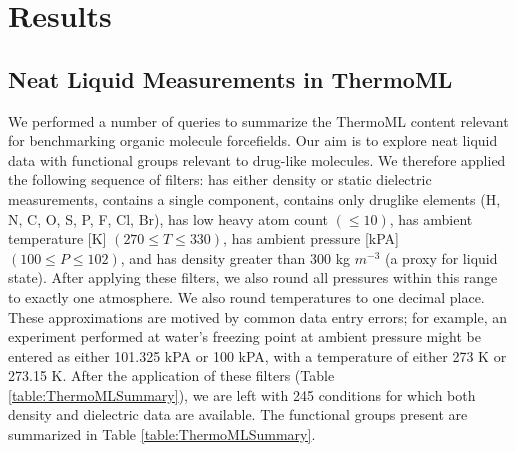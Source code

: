 \documentclass[aps,pre,twocolumn,nofootinbib,superscriptaddress,linenumbers]{revtex4-1}
\begin{document}

\section{Results}

\subsection{Neat Liquid Measurements in ThermoML}

We performed a number of queries to summarize the ThermoML content relevant for benchmarking organic molecule forcefields.  
Our aim is to explore neat liquid data with functional groups relevant to drug-like molecules.  
We therefore applied the following sequence of filters: has either density or static dielectric measurements, contains a single component, contains only druglike elements (H, N, C, O, S, P, F, Cl, Br), has low heavy atom count $(\le 10)$, has ambient temperature [K] $(270 \le T \le 330)$, has ambient pressure [kPA] $(100 \le P \le 102)$, and has density greater than 300 kg $m^{-3}$ (a proxy for liquid state).  
After applying these filters, we also round all pressures within this range to exactly one atmosphere.  We also round temperatures to one decimal place.  
These approximations are motived by common data entry errors; for example, an experiment performed at water's freezing point at ambient pressure might be entered as either 101.325 kPA or 100 kPA, with a temperature of either 273 K or 273.15 K.  
After the application of these filters (Table \ref{table:ThermoMLSummary}), we are left with 245 conditions for which both density and dielectric data are available.  
The functional groups present are summarized in Table \ref{table:ThermoMLSummary}.  

\end{document}
